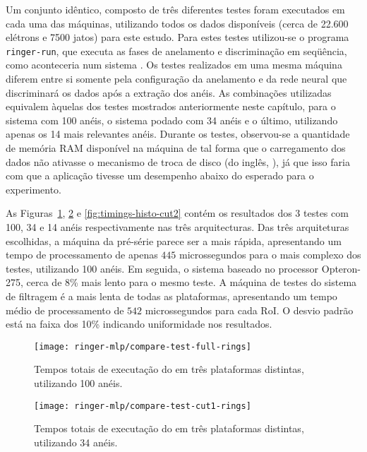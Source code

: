 Um conjunto idêntico, composto de três diferentes testes foram executados em
cada uma das máquinas, utilizando todos os dados disponíveis (cerca de 22.600
elétrons e 7500 jatos) para este estudo. Para estes testes utilizou-se o
programa \texttt{ringer-run}, que executa as fases de anelamento e
discriminação em seqüência, como aconteceria num sistema .  Os
testes realizados em uma mesma máquina diferem entre si somente pela
configuração da anelamento e da rede neural que discriminará os dados após a
extração dos anéis. As combinações utilizadas equivalem àquelas dos testes
mostrados anteriormente neste capítulo, para o sistema com 100 anéis, o
sistema podado com 34 anéis e o último, utilizando apenas os 14 mais
relevantes anéis. Durante os testes, observou-se a quantidade de memória RAM
disponível na máquina de tal forma que o carregamento dos dados não ativasse o
mecanismo de troca de disco (do inglês, ), já que isso faria com que
a aplicação tivesse um desempenho abaixo do esperado para o experimento.

As Figuras~\ref{fig:timings-histo-full}, \ref{fig:timings-histo-cut1} e
\ref{fig:timings-histo-cut2} contém os resultados dos 3 testes com 100, 34 e
14 anéis respectivamente nas três arquitecturas. Das três arquiteturas
escolhidas, a máquina da pré-série parece ser a mais rápida, apresentando um
tempo de processamento de apenas $445$ microssegundos para o mais complexo dos
testes, utilizando 100 anéis. Em seguida, o sistema baseado no processor
Opteron-275, cerca de 8\% mais lento para o mesmo teste. A máquina de testes
do sistema de filtragem é a mais lenta de todas as plataformas, apresentando
um tempo médio de processamento de $542$ microssegundos para cada RoI. O
desvio padrão está na faixa dos 10\% indicando uniformidade nos resultados.

\begin{figure}
\begin{center}
\texttt{[image: ringer-mlp/compare-test-full-rings]}
\end{center}
\caption{Tempos totais de executação do  em três plataformas
distintas, utilizando 100 anéis.}
\label{fig:timings-histo-full}
\end{figure}

\begin{figure}
\begin{center}
\texttt{[image: ringer-mlp/compare-test-cut1-rings]}
\end{center}
\caption{Tempos totais de executação do  em três plataformas
distintas, utilizando 34 anéis.}
\label{fig:timings-histo-cut1}
\end{figure}


